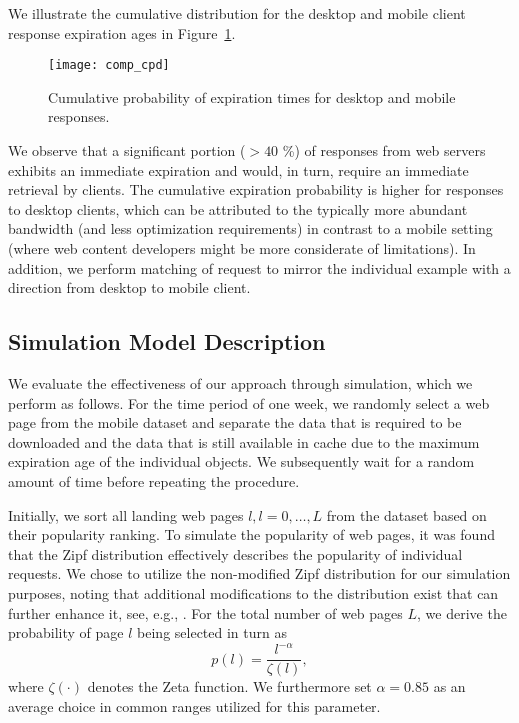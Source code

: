 We illustrate the cumulative distribution for the desktop and mobile client response expiration ages in Figure~\ref{fig:comp_cpd}.
\begin{figure}
\centering
\texttt{[image: comp\_cpd]}
	\caption{Cumulative probability of expiration times for desktop and mobile responses.}
\label{fig:comp_cpd}
\end{figure}

We observe that a significant portion ($>40$ \%) of responses from web servers exhibits an immediate expiration and would, in turn, require an immediate retrieval by clients.
The cumulative expiration probability is higher for responses to desktop clients, which can be attributed to the typically more abundant bandwidth (and less optimization requirements) in contrast to a mobile setting (where web content developers might be more considerate of limitations).
In addition, we perform matching of request to mirror the individual example with a direction from desktop to mobile client. 

\subsection*{Simulation Model Description}
We evaluate the effectiveness of our approach through simulation, which we perform as follows.
For the time period of one week, we randomly select a web page from the mobile dataset and separate the data that is required to be downloaded and the data that is still available in cache due to the maximum expiration age of the individual objects. 
We subsequently wait for a random amount of time before repeating the procedure.

Initially, we sort all landing web pages $l, l=0,\ldots,L$ from the 
dataset based on their popularity ranking.
To simulate the popularity of web pages, it was found that the Zipf distribution effectively describes the popularity of individual requests.
We chose to utilize the non-modified Zipf distribution for our simulation purposes, noting that additional modifications to the distribution exist that can further enhance it, see, e.g., \cite{KrTeSh06}.
For the total number of web pages $L$, we derive the probability of page $l$ being selected in turn as
\begin{equation}
p(l)=\frac{l^{-\alpha}}{\zeta(l)},
\end{equation}
where $\zeta(\cdot)$ denotes the Zeta function. 
We furthermore set $\alpha=0.85$ as an average choice in common ranges utilized for this parameter.

